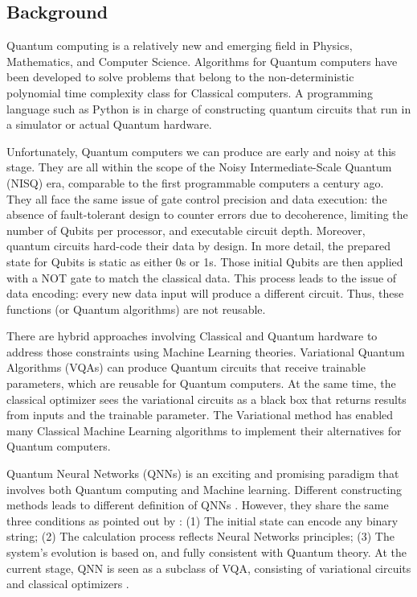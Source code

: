 \subsection{Background}
Quantum computing is a relatively new and emerging field in Physics, Mathematics, and Computer Science. 
Algorithms for Quantum computers have been developed to solve problems that belong to the non-deterministic polynomial time complexity class for Classical computers. 
A programming language such as Python is in charge of constructing quantum circuits that run in a simulator or actual Quantum hardware. 

Unfortunately, Quantum computers we can produce are early and noisy at this stage. 
They are all within the scope of the Noisy Intermediate-Scale Quantum (NISQ) era, comparable to the first programmable computers a century ago. 
They all face the same issue of gate control precision and data execution: the absence of fault-tolerant design to counter errors due to decoherence, limiting the number of Qubits per processor, and executable circuit depth. 
Moreover, quantum circuits hard-code their data by design. In more detail, the prepared state for Qubits is static as either 0s or 1s. 
Those initial Qubits are then applied with a NOT gate to match the classical data. This process leads to the issue of data encoding: every new data input will produce a different circuit. 
Thus, these functions (or Quantum algorithms) are not reusable.

There are hybrid approaches involving Classical and Quantum hardware to address those constraints using Machine Learning theories. 
Variational Quantum Algorithms (VQAs) can produce Quantum circuits that receive trainable parameters, which are reusable for Quantum computers. 
At the same time, the classical optimizer sees the variational circuits as a black box that returns results from inputs and the trainable parameter. 
The Variational method has enabled many Classical Machine Learning algorithms to implement their alternatives for Quantum computers.

Quantum Neural Networks (QNNs) \cite{altaisky2001quantum} is an exciting and promising paradigm that involves both Quantum computing and Machine learning. 
Different constructing methods leads to different definition of QNNs \cite{paetznick2013} \cite{zhaoBuildingQuantumNeural2019} \cite{caoQuantumNeuronElementary2017}. 
However, they share the same three conditions as pointed out by \cite{schuldQuestQuantumNeural2014}: 
(1) The initial state can encode any binary string;
(2) The calculation process reflects Neural Networks principles;
(3) The system's evolution is based on, and fully consistent with Quantum theory.
At the current stage, QNN is seen as a subclass of VQA, consisting of variational circuits and classical optimizers \cite{abbasPowerQuantumNeural2021}.

